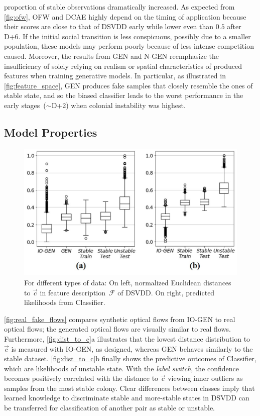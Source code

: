\documentclass[letterpaper]{article} %
\let\orgautoref\autoref
\providecommand{\Autoref}
{\def\equationautorefname{Equation}%
\def\figureautorefname{Figure}%
\def\subfigureautorefname{Figure}%
\def\Itemautorefname{Item}%
\def\tableautorefname{Table}%
\def\exerciseautorefname{Exercise}%
\def\starexerciseautorefname{Exercise}%
\def\sectionautorefname{Section}%
\def\subsectionautorefname{Section}%
\def\subsubsectionautorefname{Section}%
\def\chapterautorefname{Section}%
\def\partautorefname{Part}%
\orgautoref}
\renewcommand{\autoref}
{\def\equationautorefname{Equation}%
\def\figureautorefname{Fig.}%
\def\subfigureautorefname{Fig.}%
\def\Itemautorefname{item}%
\def\tableautorefname{Table}%
\def\exerciseautorefname{Exercise}%
\def\starexerciseautorefname{Exercise}%
\def\sectionautorefname{Section}%
\def\subsectionautorefname{Section}%
\def\subsubsectionautorefname{Section}%
\def\chapterautorefname{Section}%
\def\partautorefname{Part}%
\orgautoref}
\begin{document}
proportion of stable observations dramatically increased.
As expected from~\autoref{fig:ofw}, OFW and DCAE highly depend on the
timing of application because their scores are close to that of DSVDD
early while lower even than $0.5$ after D+6.
If the initial social transition is less conspicuous, possibly due to
a smaller population, these models may perform poorly because of less
intense competition caused.
Moreover, the results from GEN and \mbox{N-GEN}
reemphasize the insufficiency of solely relying on realism or
spatial characteristics of produced features when training generative
models.
In particular, as illustrated in~\autoref{fig:feature_space},
GEN produces fake samples that closely resemble the ones of stable state,
and so the biased classifier leads to the worst performance in
the early stages~($\sim$D+2) when colonial instability was highest.

\vspace{-1.61mm}
\subsection{Model Properties}
\label{sec:model_properties}


\begin{figure}
\centering
\includegraphics[trim={0pt 30pt 0pt 0pt},clip,width=.98\columnwidth]{dist_to_c}
\caption{For different types of data:
On left, normalized Euclidean distances to $\vec{c}$
in feature description~$\mathcal{F}$ of DSVDD.
On right, predicted likelihoods from Classifier.
}
\label{fig:dist_to_c}
\end{figure}
\Autoref{fig:real_fake_flows} compares synthetic optical flows from
\mbox{IO-GEN} to real optical flows; the generated optical flows are
visually similar to real flows. Furthermore, \autoref{fig:dist_to_c}a
illustrates that the lowest distance distribution to $\vec{c}$ is
measured with \mbox{IO-GEN}, as designed, whereas GEN behaves similarly to the
stable dataset. \Autoref{fig:dist_to_c}b finally shows the predictive
outcomes of Classifier, which are likelihoods of unstable state. With
the \emph{label switch}, the confidence becomes positively correlated
with the distance to $\vec{c}$ viewing inner outliers as samples from
the most stable colony. Clear differences between classes imply that
learned knowledge to discriminate stable and more-stable states in DSVDD
can be transferred for classification of another pair as stable or
unstable.
\end{document}
